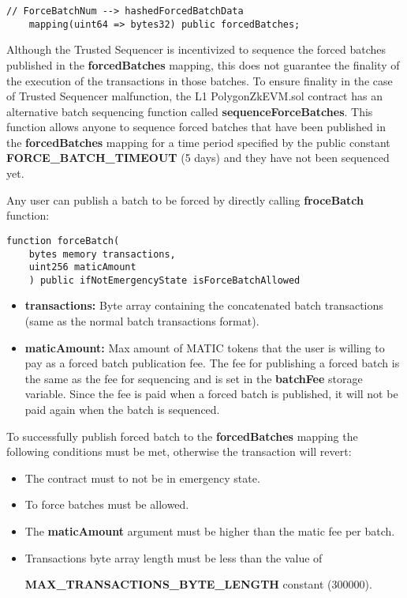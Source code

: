 \begin{lstlisting}[language=Solidity]
	// ForceBatchNum --> hashedForcedBatchData
	mapping(uint64 => bytes32) public forcedBatches;
\end{lstlisting}

Although the Trusted Sequencer is incentivized to sequence the forced batches published in the \textbf{forcedBatches} mapping, this does not guarantee the finality of the execution of the transactions in those batches. To ensure finality in the case of Trusted Sequencer malfunction, the L1 PolygonZkEVM.sol contract has an alternative batch sequencing function called \textbf{sequenceForceBatches}. This function allows anyone to sequence forced batches that have been published in the \textbf{forcedBatches} mapping for a time period specified by the public constant \textbf{FORCE\_BATCH\_TIMEOUT} (5 days) and they have not been sequenced yet.

Any user can publish a batch to be forced by directly calling \textbf{froceBatch} function:

\begin{lstlisting}[language=Solidity]
	function forceBatch(
	bytes memory transactions,
	uint256 maticAmount
	) public ifNotEmergencyState isForceBatchAllowed 
\end{lstlisting}

\begin{itemize}
	\item \textbf{transactions:} Byte array containing the concatenated batch transactions (same as the normal batch transactions format).
	\item \textbf{maticAmount:} Max amount of MATIC tokens that the user is willing to pay as a forced batch publication fee. The fee for publishing a forced batch is the same as the fee for sequencing and is set in the \textbf{batchFee} storage variable. Since the fee is paid when a forced batch is published, it will not be paid again when the batch is sequenced.
\end{itemize}



To successfully publish forced batch to  the \textbf{forcedBatches} mapping the following conditions must be met, otherwise the transaction will revert:

\begin{itemize}
	\item The contract must to not be in emergency state.
	\item To force batches must be allowed.
	\item The \textbf{maticAmount} argument must be higher than the matic fee per batch.
	\item Transactions byte array length must be less than the value of 

\textbf{MAX\_TRANSACTIONS\_BYTE\_LENGTH} constant (300000).
\end{itemize}

